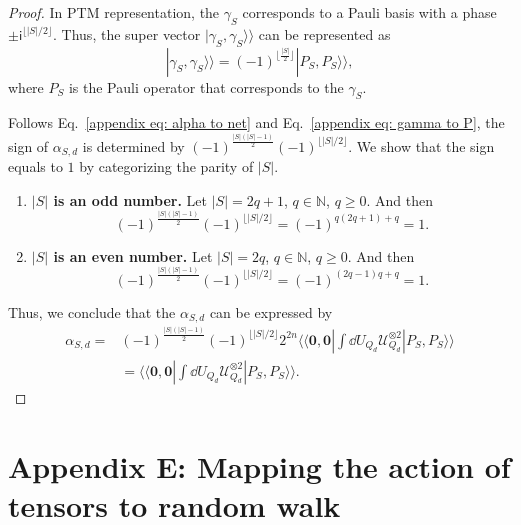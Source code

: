 \documentclass[journal=jctcce,a4paper,manuscript=article]{achemso}
\newcommand{\ii}{\mathsf{i}}
\newcommand{\supket}[1]{|#1 \rangle\rangle}
\newcommand{\supbra}[1]{\langle\langle #1 |}
\newcommand{\floor}[1]{\lfloor #1 \rfloor}
\begin{document}
\begin{proof}
  In PTM representation, the $\gamma_S$ corresponds to a Pauli basis with a phase
  $\pm \ii^{\floor{|S|/2}}$. Thus, the super vector $\supket{\gamma_S, \gamma_S}$
  can be represented as
  \begin{equation}
    \supket{\gamma_S, \gamma_S} = (-1)^{\floor{\frac{|S|}{2}}} \supket{P_S, P_S},
    \label{appendix eq: gamma to P}
  \end{equation}
  where $P_S$ is the Pauli operator that corresponds to the $\gamma_S$.

  Follows Eq.~\eqref{appendix eq: alpha to net} and Eq.~\eqref{appendix eq: gamma
    to P}, the sign of $\alpha_{S,d}$ is determined by $(-1)^{\frac{|S|(|S|-1)}{2}}
    (-1)^{\floor{|S|/2}}$. We show that the sign equals to $1$ by categorizing the
  parity of $|S|$.
  \begin{enumerate}
    \item \textbf{$|S|$ is an odd number.} Let $|S| = 2q+1$, $ q\in \mathbb{N}$, $q\geq 0$. And then
          \begin{equation}
            (-1)^{\frac{|S|(|S|-1)}{2}} (-1)^{\floor{|S|/2}} = (-1)^{q(2q+1)+q} = 1.
          \end{equation}
    \item \textbf{$|S|$ is an even number.} Let $|S| = 2q$, $ q\in \mathbb{N}$, $q\geq 0$. And then
          \begin{equation}
            (-1)^{\frac{|S|(|S|-1)}{2}} (-1)^{\floor{|S|/2}} = (-1)^{(2q-1)q+q} = 1.
          \end{equation}
  \end{enumerate}
  Thus, we conclude that the $\alpha_{S,d}$ can be expressed by
  \begin{align}
    \alpha_{S,d}= & (-1)^{\frac{|S|(|S|-1)}{2}} (-1)^{\floor{|S|/2}}  2^{2n}  \supbra{\bm 0,\bm 0}  \int\dd U_{Q_d} \mathcal{U}_{Q_d}^{\otimes 2} \supket{P_S,P_S} \\
                  & = \supbra{\bm 0,\bm 0}  \int\dd U_{Q_d} \mathcal{U}_{Q_d}^{\otimes 2} \supket{P_S,P_S} .
  \end{align}
\end{proof}

\section{Appendix E: Mapping the action of tensors to random walk}
\label{sec: Mapping the action of tensors to random walk}
\end{document}
